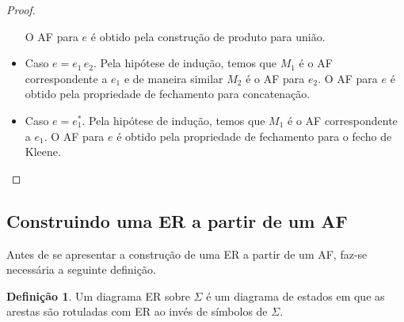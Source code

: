\documentclass[a4paper]{article}
\theoremstyle{definition}
\newtheorem{Definition}{Definição}
\begin{document}
\begin{proof}
\begin{itemize}
        O AF para $e$ é obtido pela construção de produto para união.
      \item Caso $e = e_1\,e_2$. Pela hipótese de indução, temos que $M_1$ é o
        AF correspondente a $e_1$ e de maneira similar $M_2$ é o AF para $e_2$.
        O AF para $e$ é obtido pela propriedade de fechamento para concatenação.
      \item Caso $e = e_1^*$. Pela hipótese de indução, temos que $M_1$ é o
        AF correspondente a $e_1$.
        O AF para $e$ é obtido pela propriedade de fechamento para o fecho de Kleene.
    \end{itemize}
  \end{proof}

  \subsection{Construindo uma ER a partir de um AF}

  Antes de se apresentar a construção de uma ER a partir de um AF, faz-se
  necessária a seguinte definição.

  \begin{Definition}
    Um diagrama ER sobre $\Sigma$ é um diagrama de estados em que as arestas são
    rotuladas com ER ao invés de símbolos de $\Sigma$.
  \end{Definition}
\end{document}
